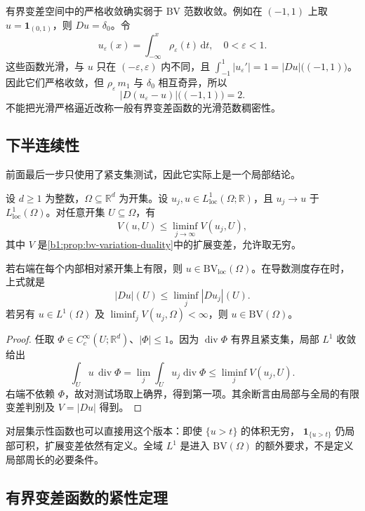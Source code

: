 有界变差空间中的严格收敛确实弱于 \(\mathrm{BV}\) 范数收敛。例如在 \((-1,1)\) 上取
\(u=\mathbf1_{(0,1)}\)，则 \(Du=\delta_0\)。令
\[
 u_\varepsilon(x)=\int_{-\infty}^x\rho_\varepsilon(t)\,\mathrm dt,
 \quad 0<\varepsilon<1.
\]
这些函数光滑，与 \(u\) 只在 \((-\varepsilon,\varepsilon)\) 内不同，且
\(\int_{-1}^1|u_\varepsilon'|=1=|Du|\bigl((-1,1)\bigr)\)。因此它们严格收敛，但
\(\rho_\varepsilon\,m_1\) 与 \(\delta_0\) 相互奇异，所以
\[
 |D(u_\varepsilon-u)|\bigl((-1,1)\bigr)=2.
\]
不能把光滑严格逼近改称一般有界变差函数的光滑范数稠密性。

\subsection{下半连续性}
\label{b1:subsec:270202}

前面最后一步只使用了紧支集测试，因此它实际上是一个局部结论。

\begin{theorem}[变差的下半连续性]\label{b1:thm:bv-lower-semicontinuity}
设 \(d\ge1\) 为整数，\(\Omega\subseteq\mathbb R^d\) 为开集。设 \(u_j,u\in L^1_{\mathrm{loc}}(\Omega;\mathbb R)\)，且
\(u_j\to u\) 于 \(L^1_{\mathrm{loc}}(\Omega)\)。对任意开集 \(U\subseteq\Omega\)，有
\[
 V(u,U)\leq\liminf_{j\to\infty}V(u_j,U),
\]
其中 \(V\) 是\cref{b1:prop:bv-variation-duality}中的扩展变差，允许取无穷。

\ProseParagraphBreak

若右端在每个内部相对紧开集上有限，则 \(u\in \mathrm{BV}_{\mathrm{loc}}(\Omega)\)。在导数测度存在时，上式就是
\[
 |Du|(U)\leq\liminf_j|Du_j|(U).
\]
若另有 \(u\in L^1(\Omega)\) 及 \(\liminf_jV(u_j,\Omega)<\infty\)，则 \(u\in \mathrm{BV}(\Omega)\)。
\end{theorem}
\begin{proof}
任取 \(\Phi\in C_c^\infty(U;\mathbb R^d)\)、\(|\Phi|\leq1\)。因为
\(\operatorname{div}\Phi\) 有界且紧支集，局部 \(L^1\) 收敛给出
\[
 \int_Uu\,\operatorname{div}\Phi
 =\lim_j\int_Uu_j\operatorname{div}\Phi
 \leq\liminf_jV(u_j,U).
\]
右端不依赖 \(\Phi\)，故对测试场取上确界，得到第一项。其余断言由局部与全局的有限变差判别及 \(V=|Du|\) 得到。
\end{proof}

对层集示性函数也可以直接用这个版本：即使 \(\{u>t\}\) 的体积无穷，
\(\mathbf1_{\{u>t\}}\) 仍局部可积，扩展变差依然有定义。全域
\(L^1\) 是进入 \(\mathrm{BV}(\Omega)\) 的额外要求，不是定义局部周长的必要条件。

\subsection{有界变差函数的紧性定理}
\label{b1:subsec:270203}

